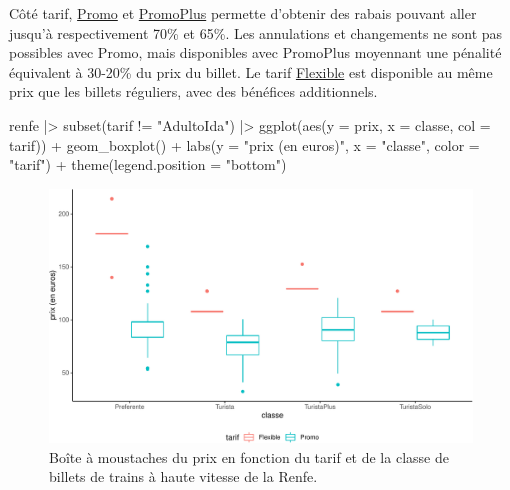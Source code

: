 \documentclass[
  11pt,
  letterpaper,
]{book}
\newenvironment{Shaded}{\begin{snugshade}}{\end{snugshade}}
\newcommand{\AttributeTok}[1]{\textcolor[rgb]{0.40,0.45,0.13}{#1}}
\newcommand{\FunctionTok}[1]{\textcolor[rgb]{0.28,0.35,0.67}{#1}}
\newcommand{\NormalTok}[1]{\textcolor[rgb]{0.00,0.23,0.31}{#1}}
\newcommand{\SpecialCharTok}[1]{\textcolor[rgb]{0.37,0.37,0.37}{#1}}
\newcommand{\StringTok}[1]{\textcolor[rgb]{0.13,0.47,0.30}{#1}}
\theoremstyle{definition}
\theoremstyle{remark}
\begin{document}
Côté tarif,
\href{http://web.archive.org/web/20161111134241/http://www.renfe.com/viajeros/tarifas/billete_promo.html}{Promo}
et
\href{http://web.archive.org/web/20161110220249/http://www.renfe.com/viajeros/tarifas/billete_promoplus.html}{PromoPlus}
permette d'obtenir des rabais pouvant aller jusqu'à respectivement 70\%
et 65\%. Les annulations et changements ne sont pas possibles avec
Promo, mais disponibles avec PromoPlus moyennant une pénalité équivalent
à 30-20\% du prix du billet. Le tarif
\href{http://web.archive.org/web/20161108192609/http://www.renfe.com/viajeros/tarifas/billete_flexible.html}{Flexible}
est disponible au même prix que les billets réguliers, avec des
bénéfices additionnels.

\begin{Shaded}
\begin{Highlighting}[]
\NormalTok{renfe }\SpecialCharTok{|\textgreater{}} 
  \FunctionTok{subset}\NormalTok{(tarif  }\SpecialCharTok{!=} \StringTok{"AdultoIda"}\NormalTok{) }\SpecialCharTok{|\textgreater{}}
  \FunctionTok{ggplot}\NormalTok{(}\FunctionTok{aes}\NormalTok{(}\AttributeTok{y =}\NormalTok{ prix, }
             \AttributeTok{x =}\NormalTok{ classe, }
             \AttributeTok{col =}\NormalTok{ tarif)) }\SpecialCharTok{+} 
    \FunctionTok{geom\_boxplot}\NormalTok{() }\SpecialCharTok{+} 
    \FunctionTok{labs}\NormalTok{(}\AttributeTok{y =} \StringTok{"prix (en euros)"}\NormalTok{,}
         \AttributeTok{x =} \StringTok{"classe"}\NormalTok{,}
         \AttributeTok{color =} \StringTok{"tarif"}\NormalTok{) }\SpecialCharTok{+}
    \FunctionTok{theme}\NormalTok{(}\AttributeTok{legend.position =} \StringTok{"bottom"}\NormalTok{)}
\end{Highlighting}
\end{Shaded}

\begin{figure}[ht!]

{\centering \includegraphics[width=1\textwidth,height=\textheight]{./01-analyseexploratoire_files/figure-pdf/fig-renfe-aed6-1.pdf}

}

\caption{\label{fig-renfe-aed6}Boîte à moustaches du prix en fonction du
tarif et de la classe de billets de trains à haute vitesse de la Renfe.}

\end{figure}
\end{document}
